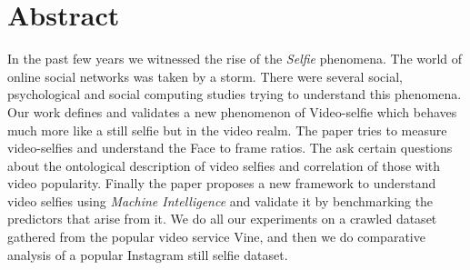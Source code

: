 \section{Abstract}
In the past few years we witnessed the rise of the \textit{Selfie} phenomena. The world of online social networks was taken by a storm. There were several social, psychological and social computing studies trying to understand this phenomena. 
Our work defines and validates a new phenomenon of Video-selfie which behaves much more like a still selfie but in the video realm. The paper tries to measure video-selfies and understand the Face to frame ratios. The ask certain questions about the ontological description of video selfies and correlation of those with video popularity. Finally the paper proposes a new framework to understand video selfies using \textit{Machine Intelligence} and validate it by benchmarking the predictors that arise from it. We do all our experiments on a crawled dataset gathered from the popular video service Vine, and then we do comparative analysis of a popular Instagram still selfie dataset. 
